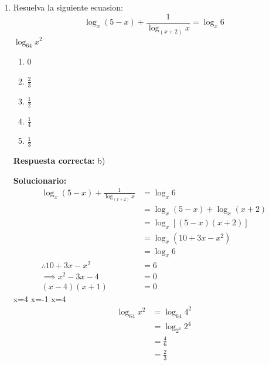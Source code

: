\begin{enumerate}
	\vspace{2mm}
	\textbf{Solucionario:}\\
	
	Los términos independientes son iguales $1 = b^c d^a + k $ $\Longrightarrow$   $1-k = b^c d^a$ \\
	
	Coeficiente principal igual:
	$$2 = a^c.c^a$$
	
	$$\therefore \left(\frac{b^d c^a}{(1-k)}\right) (a^c.c^a) = \left(\frac{1-k}{1-k}\right) (2) = 2$$
	
	\vspace{6mm}
	
	\item Resuelva la siguiente ecuasion:\\
	$$\log_x(5-x) + \frac{1}{\log_{(x+2)} x} = \log_x 6$$
	 $\log_{64} x^2$
	
	\begin{enumerate}[label=\alph*)]
		\item 0
		\item $\frac{2}{3}$
		\item $\frac{1}{2}$
		\item $\frac{1}{4}$
		\item $\frac{1}{3}$
	\end{enumerate}
	\textbf{Respuesta correcta:} b)
	
	\vspace{2mm}
	\textbf{Solucionario:}\\
	
	
	\begin{align*}
		\log_x (5-x) + \frac{1}{\log_{(x+2)} x} &= \log_x 6 \\
		&= \log_x (5-x) + \log_x (x+2) \\
		&= \log_x [(5-x)(x+2)] \\
		&= \log_x (10 + 3x - x^2) \\
		&= \log_x 6 \\
		\therefore 10 + 3x - x^2 &= 6 \\
		\implies x^2 - 3x - 4 &= 0 \\
		(x-4)(x+1) &= 0
	\end{align*}
	 x=4 \quad {} x=-1
	 x=4
	\begin{align*}
		\log_{64} x^2 &= \log_{64} 4^2 \\
		&= \log_{2^6} 2^4 \\
		&= \frac{4}{6} \\
		&= \frac{2}{3}
	\end{align*}
	

\end{enumerate}
